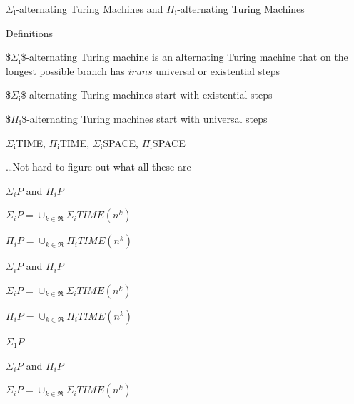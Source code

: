 \documentclass[presentation]{beamer}
\begin{document}
\begin{frame}[label={sec:orgfcecea4}]{\(\Sigma_{\text{i}}\)-alternating Turing Machines and \(\Pi_{\text{i}}\)-alternating Turing Machines}
\begin{block}{Definitions}
\begin{block}{\$\(\Sigma_{\text{i}}\)\$-alternating Turing machine is an alternating Turing machine that on the longest possible branch has \(i runs\) universal or existential steps}
\end{block}
\begin{block}{\$\(\Sigma_{\text{i}}\)\$-alternating Turing machines start with existential steps}
\end{block}
\begin{block}{\$\(\Pi_{\text{i}}\)\$-alternating Turing machines start with universal steps}
\end{block}
\end{block}
\begin{block}{\(\Sigma_{\text{i}}\)TIME, \(\Pi_{\text{i}}\)TIME, \(\Sigma_{\text{i}}\)SPACE, \(\Pi_{\text{i}}\)SPACE}
\begin{block}{\ldots{}Not hard to figure out what all these are}
\end{block}
\end{block}
\begin{block}{\(\Sigma_{i}P\) and \(\Pi _{i}P\)}
\begin{block}{\(\Sigma_{i}P = \cup_{k \in \Re} \Sigma_{i}TIME(n^{k})\)}
\end{block}
\begin{block}{\(\Pi_{i}P = \cup_{k \in \Re} \Pi_{i}TIME(n^{k})\)}
\end{block}
\end{block}
\begin{block}{\(\Sigma_{i}P\) and \(\Pi _{i}P\)}
\begin{block}{\(\Sigma_{i}P = \cup_{k \in \Re} \Sigma_{i}TIME(n^{k})\)}
\end{block}
\begin{block}{\(\Pi_{i}P = \cup_{k \in \Re} \Pi_{i}TIME(n^{k})\)}
\end{block}
\begin{block}{\(\Sigma_{1}P\)}
\end{block}
\end{block}
\begin{block}{\(\Sigma_{i}P\) and \(\Pi _{i}P\)}
\begin{block}{\(\Sigma_{i}P = \cup_{k \in \Re} \Sigma_{i}TIME(n^{k})\)}
\end{block}

\end{block}
\end{frame}
\end{document}
